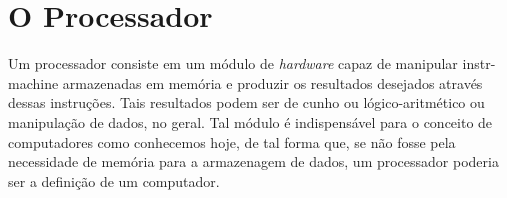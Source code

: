 \section{O Processador}

\label{sec:processor}

Um processador consiste em um módulo de \textit{hardware} capaz de manipular 
\gls{instr-machine} armazenadas
em memória e produzir os resultados desejados através dessas instruções. Tais resultados
podem ser de cunho ou lógico-aritmético ou manipulação de dados, no geral. Tal módulo é
indispensável para o conceito de computadores como conhecemos hoje, de tal forma que, se
não fosse pela necessidade de memória para a armazenagem de dados, um processador poderia
ser a definição de um computador.